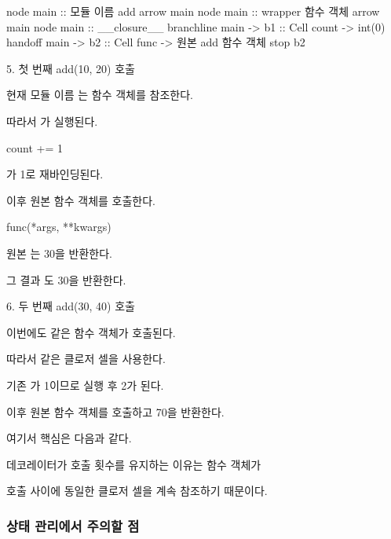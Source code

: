\begin{dhkbranch}[in=8]
node main :: 모듈 이름 add
arrow main
node main :: wrapper 함수 객체
arrow main
node main :: __closure__
branchline main -> b1 :: Cell count -> int(0)
handoff main -> b2 :: Cell func -> 원본 add 함수 객체
stop b2
\end{dhkbranch}

\begin{dhknote}
\begin{dhksmry}[centered]
5. 첫 번째 add(10, 20) 호출
\end{dhksmry}
\end{dhknote}

현재 모듈 이름 는  함수 객체를 참조한다.

따라서 가 실행된다.

\begin{dhkcode}
count += 1
\end{dhkcode}

가 1로 재바인딩된다.

이후 원본 함수 객체를 호출한다.

\begin{dhkcode}
func(*args, **kwargs)
\end{dhkcode}

원본 는 30을 반환한다.

그 결과 도 30을 반환한다.

\begin{dhknote}
\begin{dhksmry}[centered]
6. 두 번째 add(30, 40) 호출
\end{dhksmry}
\end{dhknote}

이번에도 같은  함수 객체가 호출된다.

따라서 같은 클로저 셀을 사용한다.

기존 가 1이므로  실행 후 2가 된다.

이후 원본 함수 객체를 호출하고 70을 반환한다.

여기서 핵심은 다음과 같다.

\begin{dhksmry}[centered]
데코레이터가 호출 횟수를 유지하는 이유는 함수 객체가

호출 사이에 동일한 클로저 셀을 계속 참조하기 때문이다.
\end{dhksmry}

\subsubsection{ 상태 관리에서 주의할 점}

